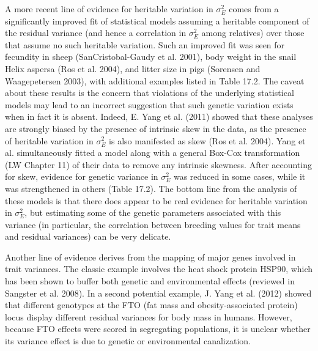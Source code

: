 \documentclass{article}
\begin{document}
A more recent line of evidence for heritable variation in  $ \sigma_E^2 $ comes from a significantly improved fit of statistical models assuming a heritable component of the residual variance (and hence a correlation in  $ \sigma_E^2 $ among relatives) over those that assume no such heritable variation. Such an improved fit was seen for fecundity in sheep (SanCristobal-Gaudy et al. 2001), body weight in the snail Helix aspersa (Ros et al. 2004), and litter size in pigs (Sorensen and Waagepetersen 2003), with additional examples listed in Table 17.2. The caveat about these results is the concern that violations of the underlying statistical models may lead to an incorrect suggestion that such genetic variation exists when in fact it is absent. Indeed, E. Yang et al. (2011) showed that these analyses are strongly biased by the presence of intrinsic skew in the data, as the presence of heritable variation in  $ \sigma_E^2 $ is also manifested as skew (Ros et al. 2004). Yang et al. simultaneously fitted a model along with a general Box-Cox transformation (LW Chapter 11) of their data to remove any intrinsic skewness. After accounting for skew, evidence for genetic variance in  $ \sigma_E^2 $ was reduced in some cases, while it was strengthened in others (Table 17.2). The bottom line from the analysis of these models is that there does appear to be real evidence for heritable variation in  $ \sigma_E^2 $, but estimating some of the genetic parameters associated with this variance (in particular, the correlation between breeding values for trait means and residual variances) can be very delicate.

Another line of evidence derives from the mapping of major genes involved in trait variances. The classic example involves the heat shock protein HSP90, which has been shown to buffer both genetic and environmental effects (reviewed in Sangster et al. 2008). In a second potential example, J. Yang et al. (2012) showed that different genotypes at the FTO (fat mass and obesity-associated protein) locus display different residual variances for body mass in humans. However, because FTO effects were scored in segregating populations, it is unclear whether its variance effect is due to genetic or environmental canalization.
\end{document}
